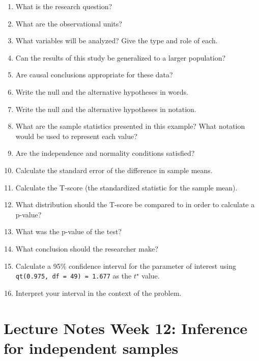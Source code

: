 \documentclass[
]{report}
\newcommand{\rgs}{\vspace{12pt}} %
\begin{document}
\begin{enumerate}
\def\labelenumi{\arabic{enumi}.}
\item
  What is the research question?
  \rgs
\item
  What are the observational units?
  \rgs
\item
  What variables will be analyzed? Give the type and role of each.
  \rgs
  \rgs
\item
  Can the results of this study be generalized to a larger population?
  \rgs
\item
  Are causal conclusions appropriate for these data?
  \rgs
\item
  Write the null and the alternative hypotheses in words.
  \rgs
  \rgs
\item
  Write the null and the alternative hypotheses in notation.
  \rgs
\item
  What are the sample statistics presented in this example? What notation would be used to represent each value?
  \rgs
\item
  Are the independence and normality conditions satisfied?
  \rgs
  \rgs
\item
  Calculate the standard error of the difference in sample means.
  \rgs
  \rgs
\item
  Calculate the T-score (the standardized statistic for the sample mean).
  \rgs
  \rgs
\item
  What distribution should the T-score be compared to in order to calculate a p-value?
  \rgs
\item
  What was the p-value of the test?
  \rgs
\item
  What conclusion should the researcher make?
  \rgs
  \rgs
\item
  Calculate a 95\% confidence interval for the parameter of interest using \texttt{qt(0.975,\ df\ =\ 49)\ =\ 1.677} as the \(t^\star\) value.
  \rgs
  \rgs
\item
  Interpret your interval in the context of the problem.
  \rgs
  \rgs
\end{enumerate}

\newpage

\hypertarget{lecture-notes-week-12-inference-for-independent-samples}{%
\section{Lecture Notes Week 12: Inference for independent samples}\label{lecture-notes-week-12-inference-for-independent-samples}}
\end{document}

